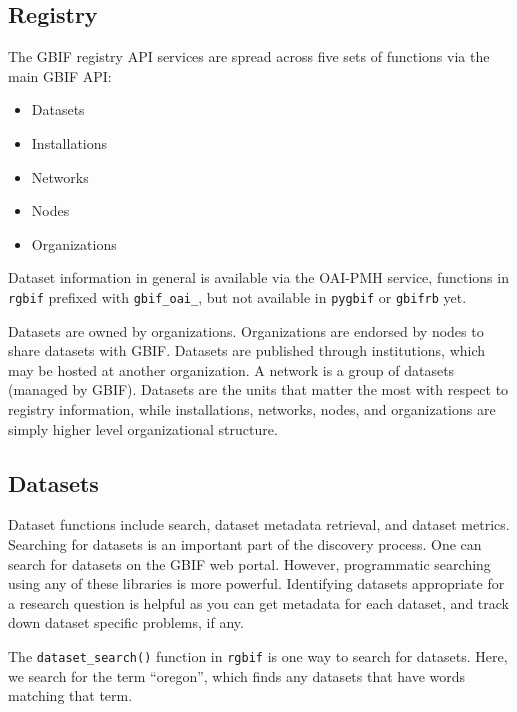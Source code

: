 \documentclass[3p]{elsarticle} %
\providecommand{\tightlist}{%
  \setlength{\itemsep}{0pt}\setlength{\parskip}{0pt}}
\begin{document}
\hypertarget{registry}{%
\subsection{Registry}\label{registry}}

The GBIF registry API services are spread across five sets of functions
via the main GBIF API:

\begin{itemize}
\tightlist
\item
  Datasets
\item
  Installations
\item
  Networks
\item
  Nodes
\item
  Organizations
\end{itemize}

Dataset information in general is available via the OAI-PMH service,
functions in \texttt{rgbif} prefixed with \texttt{gbif\_oai\_}, but not
available in \texttt{pygbif} or \texttt{gbifrb} yet.

Datasets are owned by organizations. Organizations are endorsed by nodes
to share datasets with GBIF. Datasets are published through
institutions, which may be hosted at another organization. A network is
a group of datasets (managed by GBIF). Datasets are the units that
matter the most with respect to registry information, while
installations, networks, nodes, and organizations are simply higher
level organizational structure.

\hypertarget{datasets}{%
\subsection{Datasets}\label{datasets}}

Dataset functions include search, dataset metadata retrieval, and
dataset metrics. Searching for datasets is an important part of the
discovery process. One can search for datasets on the GBIF web portal.
However, programmatic searching using any of these libraries is more
powerful. Identifying datasets appropriate for a research question is
helpful as you can get metadata for each dataset, and track down dataset
specific problems, if any.

The \texttt{dataset\_search()} function in \texttt{rgbif} is one way to
search for datasets. Here, we search for the term ``oregon'', which
finds any datasets that have words matching that term.
\end{document}
